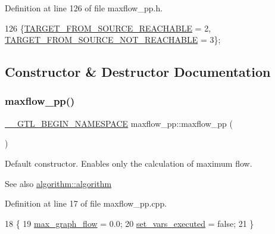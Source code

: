 Definition at line 126 of file maxflow\+\_\+pp.\+h.


\begin{DoxyCode}
126 \{\mbox{\hyperlink{classmaxflow__pp_abd042f1baa6a6200b5bbed755f400d2da54cf9dadeb9ec5994a80e0237d9f2872}{TARGET\_FROM\_SOURCE\_REACHABLE}} = 2, 
      \mbox{\hyperlink{classmaxflow__pp_abd042f1baa6a6200b5bbed755f400d2dac84c2bfbc74bc6ee5535b2c212502c02}{TARGET\_FROM\_SOURCE\_NOT\_REACHABLE}} = 3\};
\end{DoxyCode}


\subsection{Constructor \& Destructor Documentation}
\mbox{\label{classmaxflow__pp_aec8a04b92a27e8720561ad489a9fb912}} 
\subsubsection{\texorpdfstring{maxflow\+\_\+pp()}{maxflow\_pp()}}
{\footnotesize\ttfamily \mbox{\hyperlink{_g_t_l_8h_a2d9f24096ac60918452dd51f32b64aa9}{\+\_\+\+\_\+\+G\+T\+L\+\_\+\+B\+E\+G\+I\+N\+\_\+\+N\+A\+M\+E\+S\+P\+A\+CE}} maxflow\+\_\+pp\+::maxflow\+\_\+pp (\begin{DoxyParamCaption}{ }\end{DoxyParamCaption})}

Default constructor. Enables only the calculation of maximum flow.

\begin{DoxySeeAlso}{See also}
\mbox{\hyperlink{classalgorithm_ab79e1ddec2f2afdf4b36b10724db8b15}{algorithm\+::algorithm}} 
\end{DoxySeeAlso}


Definition at line 17 of file maxflow\+\_\+pp.\+cpp.


\begin{DoxyCode}
18 \{
19     \mbox{\hyperlink{classmaxflow__pp_abdda1871e70fd2de0f2006eff57dc94e}{max\_graph\_flow}} = 0.0;
20     \mbox{\hyperlink{classmaxflow__pp_a6642619150b9c12790df2171cfa2c05f}{set\_vars\_executed}} = \textcolor{keyword}{false};
21 \}
\end{DoxyCode}
\mbox{\label{classmaxflow__pp_a2f96bfeea4cb2c044d155d356d72452a}} 
